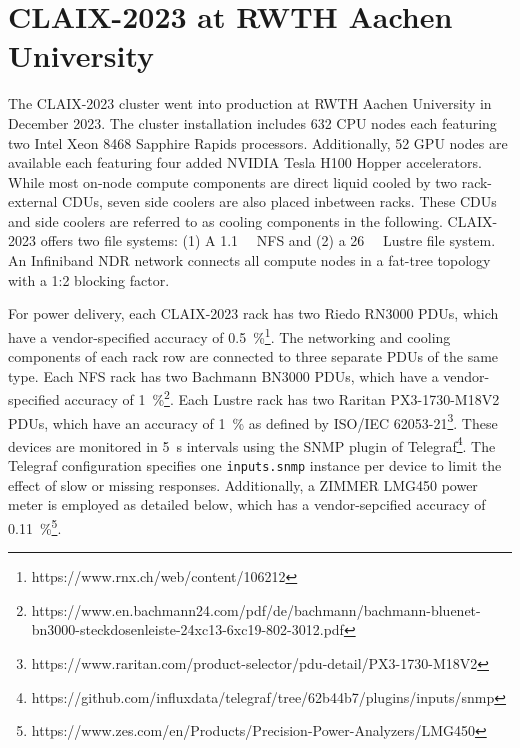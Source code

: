 \section{CLAIX-2023 at RWTH Aachen University}

The CLAIX-2023 cluster went into production at RWTH Aachen University in December 2023.
The cluster installation includes 632 CPU nodes each featuring two Intel Xeon 8468 Sapphire Rapids processors.
Additionally, 52 GPU nodes are available each featuring four added NVIDIA Tesla H100 Hopper accelerators.
While most on-node compute components are direct liquid cooled by two rack-external \acp{CDU}, seven side coolers are also placed inbetween racks.
These \acp{CDU} and side coolers are referred to as cooling components in the following.
CLAIX-2023 offers two file systems: (1) A \SI{1.1}{\peta\byte} NFS and (2) a \SI{26}{\peta\byte} Lustre file system.
An Infiniband NDR network connects all compute nodes in a fat-tree topology with a 1:2 blocking factor.

For power delivery, each CLAIX-2023 rack has two Riedo RN3000 \acp{PDU}, which have a vendor-specified accuracy of \SI{0.5}{\percent}\footnote{https://www.rnx.ch/web/content/106212}.
The networking and cooling components of each rack row are connected to three separate \acp{PDU} of the same type.
Each NFS rack has two Bachmann BN3000 \acp{PDU}, which have a vendor-specified accuracy of \SI{1}{\percent}\footnote{https://www.en.bachmann24.com/pdf/de/bachmann/bachmann-bluenet-bn3000-steckdosenleiste-24xc13-6xc19-802-3012.pdf}.
Each Lustre rack has two Raritan PX3-1730-M18V2 \acp{PDU}, which have an accuracy of \SI{1}{\percent} as defined by ISO/IEC 62053-21\footnote{https://www.raritan.com/product-selector/pdu-detail/PX3-1730-M18V2}.
These devices are monitored in \SI{5}{\second} intervals using the SNMP plugin of Telegraf\footnote{https://github.com/influxdata/telegraf/tree/62b44b7/plugins/inputs/snmp}.
The Telegraf configuration specifies one \texttt{inputs.snmp} instance per device to limit the effect of slow or missing responses.
Additionally, a ZIMMER LMG450 power meter is employed as detailed below, which has a vendor-sepcified accuracy of \SI{0.11}{\percent}\footnote{https://www.zes.com/en/Products/Precision-Power-Analyzers/LMG450}.

